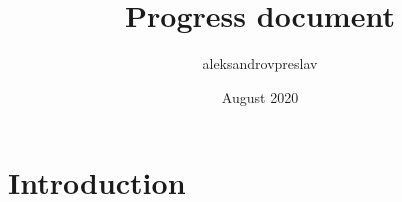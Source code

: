 \documentclass{article}
\title{Progress document}
\author{aleksandrovpreslav }
\date{August 2020}
\begin{document}
\maketitle

\section{Introduction}
\end{document}

